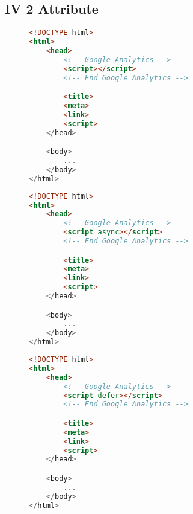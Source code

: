 \subsection{IV 2 Attribute}

\begin{sidewaysfigure}
\begin{multicols}{3}
\begin{center}
\begin{lstlisting}[caption={Attribute none}, language=html, numbers=none]
<!DOCTYPE html>
<html>
    <head>
        <!-- Google Analytics -->
        <script></script>
        <!-- End Google Analytics -->

        <title>
        <meta>
        <link>
        <script>
    </head>

    <body>
        ...
    </body>
</html>
\end{lstlisting}
\end{center}

\columnbreak

\begin{center}
\begin{lstlisting}[caption={Attribute async}, language=html, numbers=none]
<!DOCTYPE html>
<html>
    <head>
        <!-- Google Analytics -->
        <script async></script>
        <!-- End Google Analytics -->

        <title>
        <meta>
        <link>
        <script>
    </head>

    <body>
        ...
    </body>
</html>
\end{lstlisting}
\end{center}

\columnbreak

\begin{center}
\begin{lstlisting}[caption={Attribute defer}, language=html, numbers=none]
<!DOCTYPE html>
<html>
    <head>
        <!-- Google Analytics -->
        <script defer></script>
        <!-- End Google Analytics -->

        <title>
        <meta>
        <link>
        <script>
    </head>

    <body>
        ...
    </body>
</html>
\end{lstlisting}
\end{center}
\end{multicols}
\end{sidewaysfigure}








